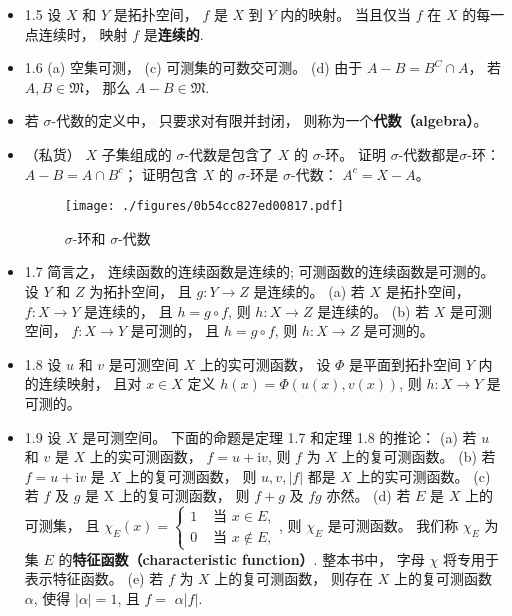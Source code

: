 \begin{itemize}
\item 1.5 设 $X$ 和 $Y$ 是拓扑空间， $f$ 是 $X$ 到 $Y$ 内的映射。 当且仅当 $f$ 在 $X$ 的每一点连续时， 映射 $f$ 是\textbf{连续的}.

\item 1.6 (a) 空集可测， (c) 可测集的可数交可测。 (d) 由于 $A-B = B^C\cap A$， 若 $A,B \in \mathfrak{M}$， 那么 $A-B\in \mathfrak{M}$.

\item 若 $\sigma$-代数的定义中， 只要求对有限并封闭， 则称为一个\textbf{代数（algebra）}。

\item （私货） $X$ 子集组成的 $\sigma$-代数是包含了 $X$ 的 $\sigma$-环。 证明 $\sigma$-代数都是$\sigma$-环： $A-B = A\cap B^c$； 证明包含 $X$ 的 $\sigma$-环是 $\sigma$-代数： $A^c = X-A$。

\begin{figure}[ht]
\centering
\texttt{[image: ./figures/0b54cc827ed00817.pdf]}
\caption{$\sigma$-环和 $\sigma$-代数} \label{fig_AnalN4_1}
\end{figure}

\item 1.7 简言之， 连续函数的连续函数是连续的; 可测函数的连续函数是可测的。 设 $Y$ 和 $Z$ 为拓扑空间， 且 $g: Y \rightarrow Z$ 是连续的。 (a) 若 $X$ 是拓扑空间， $f: X \rightarrow Y$ 是连续的， 且 $h=g \circ f$, 则 $h: X \rightarrow Z$ 是连续的。 (b) 若 $X$ 是可测空间， $f: X \rightarrow Y$ 是可测的， 且 $h=g \circ f$, 则 $h: X \rightarrow Z$ 是可测的。 

\item 1.8 设 $u$ 和 $v$ 是可测空间 $X$ 上的实可测函数， 设 $\Phi$ 是平面到拓扑空间 $Y$ 内的连续映射， 且对 $x \in X$ 定义 $h(x)=\Phi(u(x), v(x))$, 则 $h: X \rightarrow Y$ 是可测的。

\item 1.9 设 $X$ 是可测空间。 下面的命题是定理 1.7 和定理 1.8 的推论：
(a) 若 $u$ 和 $v$ 是 $X$ 上的实可测函数， $f=u+\mathrm{i} v$, 则 $f$ 为 $X$ 上的复可测函数。 
(b) 若 $f=u+\mathrm{i} v$ 是 $X$ 上的复可测函数， 则 $u, v,|f|$ 都是 $X$ 上的实可测函数。 
(c) 若 $f$ 及 $g$ 是 $\mathrm{X}$ 上的复可测函数， 则 $f+g$ 及 $f g$ 亦然。
(d) 若 $E$ 是 $X$ 上的可测集， 且 $\chi_{E}(x)= \begin{cases}1 & \text { 当 } x \in E, \\ 0 & \text { 当 } x \notin E,\end{cases}$, 则 $\chi_{E}$ 是可测函数。 我们称 $\chi_{E}$ 为集 $E$ 的\textbf{特征函数（characteristic function）}. 整本书中， 字母 $\chi$ 将专用于表示特征函数。
(e) 若 $f$ 为 $X$ 上的复可测函数， 则存在 $X$ 上的复可测函数 $\alpha$, 使得 $|\alpha|=1$, 且 $f=$ $\alpha|f|$.


\end{itemize}
